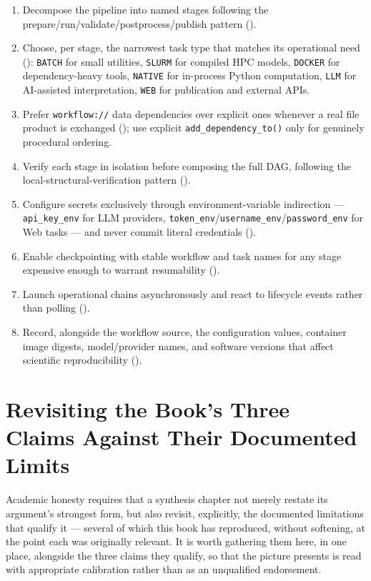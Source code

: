 \begin{enumerate}[leftmargin=1.8em]
  \item Decompose the pipeline into named stages following the
    prepare/run/validate/postprocess/publish pattern
    ().
  \item Choose, per stage, the narrowest task type that matches its
    operational need ():
    \texttt{BATCH} for small utilities, \texttt{SLURM} for compiled HPC
    models, \texttt{DOCKER} for dependency-heavy tools, \texttt{NATIVE} for
    in-process Python computation, \texttt{LLM} for AI-assisted
    interpretation, \texttt{WEB} for publication and external APIs.
  \item Prefer \texttt{workflow://} data dependencies over explicit ones
    whenever a real file product is exchanged (); use
    explicit \texttt{add\_dependency\_to()} only for genuinely procedural
    ordering.
  \item Verify each stage in isolation before composing the full DAG,
    following the local-structural-verification pattern
    ().
  \item Configure secrets exclusively through environment-variable
    indirection --- \texttt{api\_key\_env} for LLM providers,
    \texttt{token\_env}/\texttt{username\_env}/\texttt{password\_env} for
    Web tasks --- and never commit literal credentials
    ().
  \item Enable checkpointing with stable workflow and task names for any
    stage expensive enough to warrant resumability ().
  \item Launch operational chains asynchronously and react to lifecycle
    events rather than polling ().
  \item Record, alongside the workflow source, the configuration values,
    container image digests, model/provider names, and software versions
    that affect scientific reproducibility ().
\end{enumerate}

\section{Revisiting the Book's Three Claims Against Their Documented Limits}

Academic honesty requires that a synthesis chapter not merely restate its
argument's strongest form, but also revisit, explicitly, the documented
limitations that qualify it --- several of which this book has reproduced,
without softening, at the point each was originally relevant. It is worth
gathering them here, in one place, alongside the three claims they qualify,
so that the picture  presents is read with appropriate
calibration rather than as an unqualified endorsement.

